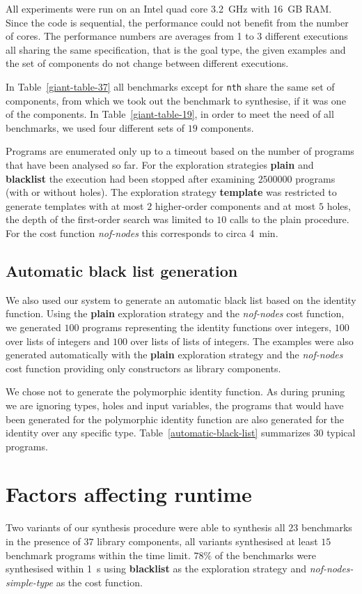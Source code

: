 All experiments were run on an Intel quad core 3.2~GHz with 16~GB RAM. Since the code is sequential, the performance could not benefit from the number of cores. The performance numbers are averages from 1 to 3 different executions all sharing the same specification, that is the goal type, the given examples and the set of components do not change between different executions.

In Table~\ref{giant-table-37} all benchmarks except for \lstinline?nth? share the same set of components, from which we took out the benchmark to synthesise, if it was one of the components. In Table~\ref{giant-table-19}, in order to meet the need of all benchmarks, we used four different sets of $19$ components.

Programs are enumerated only up to a timeout based on the number of programs that have been analysed so far. For the exploration strategies \textbf{plain} and \textbf{blacklist} the execution had been stopped after examining $2500000$ programs (with or without holes). The exploration strategy \textbf{template} was restricted to generate templates with at most $2$ higher-order components and at most $5$ holes, the depth of the first-order search was limited to $10$ calls to the plain procedure. For the cost function \textit{nof-nodes} this corresponds to circa \SI{4}{min}.

\subsection{Automatic black list generation}\label{Black list generation}
We also used our system to generate an automatic black list based on the identity function. Using the \textbf{plain} exploration strategy and the \textit{nof-nodes} cost function, we generated $100$ programs representing the identity functions over integers, $100$ over lists of integers and $100$ over lists of lists of integers. The examples were also generated automatically with the \textbf{plain} exploration strategy and the \textit{nof-nodes} cost function providing only constructors as library components.

We chose not to generate the polymorphic identity function. As during pruning we are ignoring types, holes and input variables, the programs that would have been generated for the polymorphic identity function are also generated for the identity over any specific type.
Table~\ref{automatic-black-list} summarizes $30$ typical programs.


\section{Factors affecting runtime}\label{Factors affecting runtime}
Two variants of our synthesis procedure were able to synthesis all $23$ benchmarks in the presence of $37$ library components, all variants synthesised at least $15$ benchmark programs within the time limit. $78\%$ of the benchmarks were synthesised within \SI{1}{s} using \textbf{blacklist} as the exploration strategy and \textit{nof-nodes-simple-type} as the cost function.

